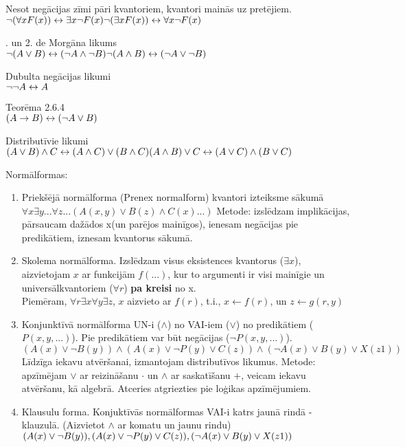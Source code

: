 \documentclass[12pt]{article}
\begin{document}
\noindent
Nesot negācijas zīmi pāri kvantoriem, kvantori mainās uz pretējiem.\\
$\neg(\forall x F(x)) \leftrightarrow \exists x\neg F(x)\\
\neg(\exists x F(x)) \leftrightarrow \forall x\neg F(x)\\
$

. un 2. de Morgāna likums\\
$\neg(A \lor B) \leftrightarrow (\neg A \land \neg B)\\
\neg(A \land B) \leftrightarrow (\neg A \lor \neg B)\\
$

\noindent
Dubulta negācijas likumi\\
$\neg\neg A \leftrightarrow A\\
$

\noindent
Teorēma 2.6.4\\
$(A \rightarrow B ) \leftrightarrow (\neg A \lor B )\\
$

\noindent
Distributīvie likumi\\
$(A \lor B) \land C \leftrightarrow (A \land C) \lor (B \land C) \\
(A \land B) \lor C \leftrightarrow (A \lor C) \land (B \lor C) \\
$

Normālformas:
\begin{enumerate}
\item
Priekšējā normālforma (Prenex normalform) kvantori izteiksme sākumā
 $\forall x \exists y ... \forall z  ... (A(x,y)\lor B(z) \land C(x) ...)$ Metode: izslēdzam implikācijas, pārsaucam dažādos x(un parējos mainīgos), ienesam negācijas pie predikātiem, iznesam kvantorus sākumā. 
\item
Skolema normālforma. Izslēdzam visus eksistences kvantorus ($\exists x$), aizvietojam $x$ ar funkcijām $f(...)$, kur to argumenti ir visi mainīgie un universālkvantoriem ($\forall r$) \textbf{pa kreisi} no x.\\
Piemēram, $\forall r \exists x \forall y \exists z$, $x$ aizvieto ar $f(r)$, t.i., $x \leftarrow f(r)$, un $z \leftarrow g(r,y)$
\item
Konjunktīvā normālforma UN-i ($\land$) no VAI-iem ($\lor$) no predikātiem ($P(x,y, ...)$). Pie predikātiem var būt negācijas ($\neg P(x,y, ...)$).\\
$(A(x)\lor \neg B(y))\land (A(x)\lor \neg P(y) \lor C(z)) \land (\neg A(x)\lor B(y) \lor X(z1))$\\
Līdzīga iekavu atvēršanai, izmantojam distributīvos likumus. Metode: apzīmējam $\lor$ ar reizināšanu $\cdot$ un $\land$ ar saskatīšanu $+$, veicam iekavu atvēršanu, kā algebrā. Atceries atgriezties pie loģikas apzīmējumiem. 
\item
Klausulu forma. Konjuktīvās normālformas VAI-i katrs jaunā rindā - klauzulā. (Aizvietot $\land$ ar komatu un jaunu rindu)\\
$(A(x)\lor \neg B(y)),\\
 (A(x)\lor \neg P(y) \lor C(z)),\\
 (\neg A(x)\lor B(y) \lor X(z1))$
\end{enumerate}
\end{document}
